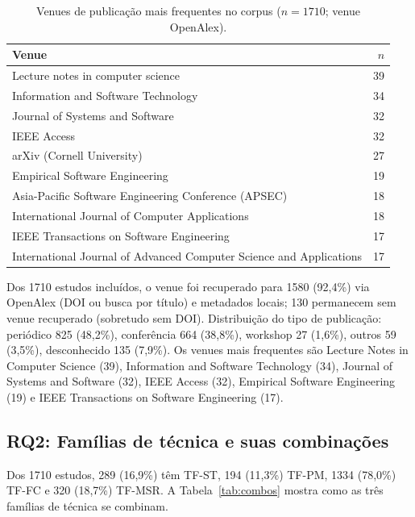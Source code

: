 \documentclass[preprint,12pt,authoryear=false]{elsarticle}
\newcommand{\PM}{TF-PM}
\newcommand{\ST}{TF-ST}
\newcommand{\FC}{TF-FC}
\newcommand{\MSR}{TF-MSR}
\begin{document}
\begin{table}[t]
\centering\small
\caption{Venues de publicação mais frequentes no corpus ($n = 1710$; venue OpenAlex).}
\label{tab:venues}
\begin{tabular}{lr}
\toprule
Venue & $n$ \\
\midrule
Lecture notes in computer science & 39 \\
Information and Software Technology & 34 \\
Journal of Systems and Software & 32 \\
IEEE Access & 32 \\
arXiv (Cornell University) & 27 \\
Empirical Software Engineering & 19 \\
Asia-Pacific Software Engineering Conference (APSEC) & 18 \\
International Journal of Computer Applications & 18 \\
IEEE Transactions on Software Engineering & 17 \\
International Journal of Advanced Computer Science and Applications & 17 \\
\bottomrule
\end{tabular}
\end{table}

Dos 1710 estudos incluídos, o venue foi recuperado para 1580 (92,4\%) via OpenAlex (DOI ou busca por título) e metadados locais; 130 permanecem sem venue recuperado (sobretudo sem DOI). Distribuição do tipo de publicação: periódico 825 (48,2\%), conferência 664 (38,8\%), workshop 27 (1,6\%), outros 59 (3,5\%), desconhecido 135 (7,9\%). Os venues mais frequentes são Lecture Notes in Computer Science (39), Information and Software Technology (34), Journal of Systems and Software (32), IEEE Access (32), Empirical Software Engineering (19) e IEEE Transactions on Software Engineering (17).

\subsection{RQ2: Famílias de técnica e suas combinações}\label{sec:rq2}

Dos 1710 estudos, 289 (16,9\%) têm \ST{}, 194 (11,3\%) \PM{}, 1334 (78,0\%) \FC{} e 320 (18,7\%) \MSR{}. A Tabela~\ref{tab:combos} mostra como as três famílias de técnica se combinam.
\end{document}
